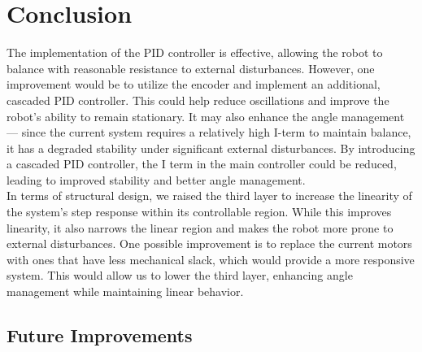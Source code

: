 \documentclass{article}
\begin{document}
\section{Conclusion}

\begin{minipage}{\linewidth}
    The implementation of the PID controller is effective, allowing the robot to
    balance with reasonable resistance to external disturbances. However, one
    improvement would be to utilize the encoder and implement an additional,
    cascaded PID controller. This could help reduce oscillations and improve the
    robot's ability to remain stationary. It may also enhance the angle
    management — since the current system requires a relatively high I-term to
    maintain balance, it has a degraded stability under significant external
    disturbances. By introducing a cascaded PID controller, the I term in the main
    controller could be reduced, leading to improved stability and better angle
    management. \\

    In terms of structural design, we raised the third layer to increase the
    linearity of the system's step response within its controllable region. While
    this improves linearity, it also narrows the linear region and makes the robot
    more prone to external disturbances. One possible improvement is to replace the
    current motors with ones that have less mechanical slack, which would provide a
    more responsive system. This would allow us to lower the third layer, enhancing
    angle management while maintaining linear behavior. \\
\end{minipage}

\subsection{Future Improvements}
\end{document}
